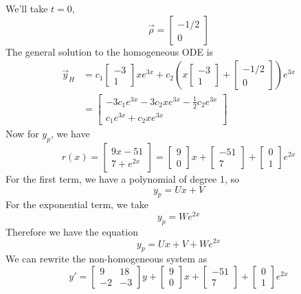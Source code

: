 \documentclass[openany]{report}
\begin{document}
We'll take $t= 0$, 
\[\vec{\rho} = \begin{bmatrix}
    -1/2\\
    0
\end{bmatrix}\]
The general solution to the homogeneous ODE is 
\begin{align*}
    \vec{y}_H &= c_1\begin{bmatrix}-3\\1\end{bmatrix}xe^{3x} + c_2\left(x\begin{bmatrix}
        -3\\
        1
    \end{bmatrix} + \begin{bmatrix}
        -1/2\\
        0
    \end{bmatrix}\right)e^{3x}  \\
    &= \begin{bmatrix}
        -3c_1e^{3x} - 3c_2xe^{3x} - \frac{1}{2}c_2e^{3x}\\
        c_1e^{3x} + c_2xe^{3x}
    \end{bmatrix}
\end{align*}
Now for $y_p$, we have 
\[r(x) = \begin{bmatrix}
    9x - 51\\
    7 + e^{2x}
\end{bmatrix} = \begin{bmatrix}
    9\\
    0
\end{bmatrix}x + \begin{bmatrix}
    -51\\
    7
\end{bmatrix} + \begin{bmatrix}
    0\\
    1
\end{bmatrix}e^{2x}\]
For the first term, we have a polynomial of degree 1, so 
\[y_p = Ux + V\]
For the exponential term, we take 
\[y_p = We^{2x}\]
Therefore we have the equation 
\[y_p = Ux + V + We^{2x}\]
We can rewrite the non-homogeneous system as 
\[y' = \begin{bmatrix}
    9 & 18\\
    -2 & -3
\end{bmatrix}y + \begin{bmatrix}
    9\\0
\end{bmatrix}x + \begin{bmatrix}
    -51\\7
\end{bmatrix} + \begin{bmatrix}
    0\\1
\end{bmatrix}e^{2x}\]
\end{document}
